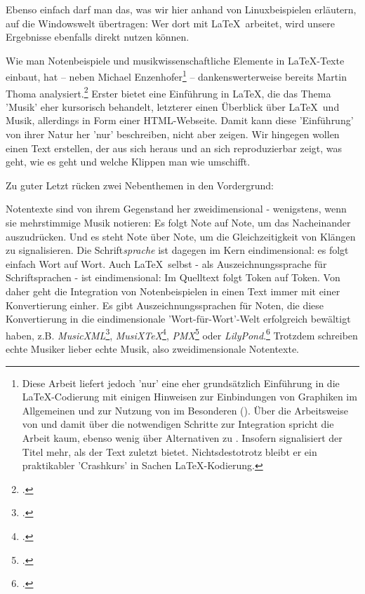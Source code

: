 Ebenso einfach darf man das, was wir hier anhand von Linuxbeispielen erläutern,
auf die Windowswelt übertragen: Wer dort mit \LaTeX\ arbeitet, wird unsere
Ergebnisse ebenfalls direkt nutzen können.

Wie man Notenbeispiele und musikwissenschaftliche Elemente in \LaTeX-Texte
einbaut, hat -- neben Michael Enzenhofer\footnote{Diese Arbeit liefert jedoch
'nur' eine eher grundsätzlich Einführung in die \LaTeX-Co\-die\-rung mit einigen
Hinweisen zur Einbindungen von Graphiken im Allgemeinen und zur Nutzung von
 im Besonderen (\cite[vgl. dazu][4ff, 31ff u.
21ff]{Enzenhofer2016a}). Über die Arbeitsweise von  und damit über
die notwendigen Schritte zur Integration spricht die Arbeit kaum, ebenso wenig
über Alternativen zu . Insofern signalisiert der Titel mehr, als
der Text zuletzt bietet. Nichtsdestotrotz bleibt er ein praktikabler 'Crashkurs'
in Sachen \LaTeX-Kodierung.} -- dankenswerterweise bereits Martin Thoma
analysiert.\footcite[vgl.][\nopage wp.]{Thoma2018a} Erster bietet eine Einführung
in \LaTeX, die das Thema 'Musik' eher kursorisch behandelt, letzterer einen
Überblick über \LaTeX\ und Musik, allerdings in Form einer HTML-Webseite.
Damit kann diese 'Einführung' von ihrer Natur her 'nur' beschreiben, nicht aber
zeigen. Wir hingegen wollen einen Text erstellen, der aus sich heraus und an
sich reproduzierbar zeigt, was geht, wie es geht und welche Klippen man wie
umschifft.

Zu guter Letzt rücken zwei Nebenthemen in den Vordergrund:

Notentexte sind von ihrem Gegenstand her zweidimensional - wenigstens, wenn sie
mehrstimmige Musik notieren: Es folgt Note auf Note, um das Nacheinander
auszudrücken. Und es steht Note über Note, um die Gleichzeitigkeit von Klängen
zu signalisieren. Die Schrift\textit{sprache} ist dagegen im Kern eindimensional:
es folgt einfach Wort auf Wort. Auch \LaTeX\ selbst - als Auszeichnungssprache
für Schriftsprachen - ist eindimensional: Im Quelltext folgt Token auf Token.
Von daher geht die Integration von Notenbeispielen in einen Text immer mit einer
Konvertierung einher. Es gibt Auszeichnungssprachen für Noten, die diese
Konvertierung in die eindimensionale 'Wort-für-Wort'-Welt erfolgreich bewältigt
haben, z.B. \textit{MusicXML}\footcite[vgl.][\nopage wp.]{MusicXML2018a},
\textit{MusiX\TeX}\footcite[vgl.][\nopage wp.]{CtanMusixTex2018a},
\textit{PMX}\footcite[vgl.][\nopage wp.]{CtanPmx2018a} oder
\textit{LilyPond}.\footcite[vgl.][\nopage wp.]{LilyPond2018a} Trotzdem schreiben
echte Musiker lieber echte Musik, also zweidimensionale Notentexte. 

